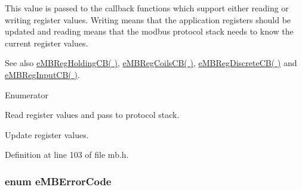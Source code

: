 This value is passed to the callback functions which support either reading or writing register values. Writing means that the application registers should be updated and reading means that the modbus protocol stack needs to know the current register values.

\begin{DoxySeeAlso}{See also}
\hyperlink{group__modbus__registers_ga10d37e1d80224bf3b1eeb9e246d7582e}{e\+M\+B\+Reg\+Holding\+C\+B( )}, \hyperlink{group__modbus__registers_ga88d9b719291515c60eee1bf9ffa1dd02}{e\+M\+B\+Reg\+Coils\+C\+B( )}, \hyperlink{group__modbus__registers_ga38101f5da54af137e210a3b8b9fa3887}{e\+M\+B\+Reg\+Discrete\+C\+B( )} and \hyperlink{group__modbus__registers_ga7816677520b1eb2ebecf15060a41bc81}{e\+M\+B\+Reg\+Input\+C\+B( )}. 
\end{DoxySeeAlso}
\begin{Desc}
\item[Enumerator]\par
\begin{description}
\item[{\em 
M\+B\+\_\+\+R\+E\+G\+\_\+\+R\+E\+AD\hypertarget{group__modbus_ggaf1398cbbeb317b1dbd0276b275f5b0f8aa210c1d03e2745efb42486b822740d4b}{}\label{group__modbus_ggaf1398cbbeb317b1dbd0276b275f5b0f8aa210c1d03e2745efb42486b822740d4b}
}]Read register values and pass to protocol stack. \item[{\em 
M\+B\+\_\+\+R\+E\+G\+\_\+\+W\+R\+I\+TE\hypertarget{group__modbus_ggaf1398cbbeb317b1dbd0276b275f5b0f8a3d0a62208562b69c5e7692a5a168c14e}{}\label{group__modbus_ggaf1398cbbeb317b1dbd0276b275f5b0f8a3d0a62208562b69c5e7692a5a168c14e}
}]Update register values. \end{description}
\end{Desc}


Definition at line 103 of file mb.\+h.

\subsubsection[{\texorpdfstring{e\+M\+B\+Error\+Code}{eMBErrorCode}}]{\setlength{\rightskip}{0pt plus 5cm}enum {\bf e\+M\+B\+Error\+Code}}\hypertarget{group__modbus_ga9e7fce8c431cb0e521c67f7f36dd823d}{}\label{group__modbus_ga9e7fce8c431cb0e521c67f7f36dd823d}


